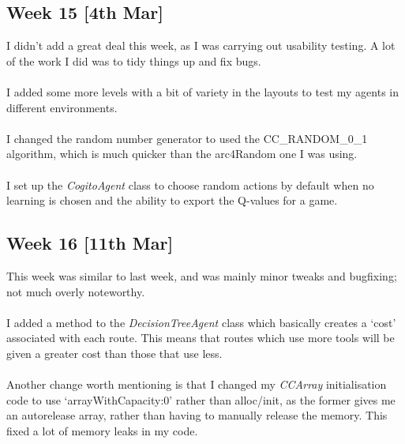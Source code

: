 \documentclass[a4paper,oneside]{report}
\begin{document}
\subsection{Week 15 [4th Mar]}

I didn't add a great deal this week, as I was carrying out usability testing. A lot of the work I did was to tidy things up and fix bugs.

\paragraph{} I added some more levels with a bit of variety in the layouts to test my agents in different environments.

\paragraph{} I changed the random number generator to used the CC\_RANDOM\_0\_1 algorithm, which is much quicker than the arc4Random one I was using.

\paragraph{} I set up the \emph{CogitoAgent} class to choose random actions by default when no learning is chosen and the ability to export the Q-values for a game.



\subsection{Week 16 [11th Mar]}

This week was similar to last week, and was mainly minor tweaks and bugfixing; not much overly noteworthy.

\paragraph{} I added a method to the \emph{DecisionTreeAgent} class which basically creates a `cost' associated with each route. This means that routes which use more tools will be given a greater cost than those that use less.

\paragraph{} Another change worth mentioning is that I changed my \emph{CCArray} initialisation code to use `arrayWithCapacity:0' rather than alloc/init, as the former gives me an autorelease array, rather than having to manually release the memory. This fixed a lot of memory leaks in my code.
\end{document}
